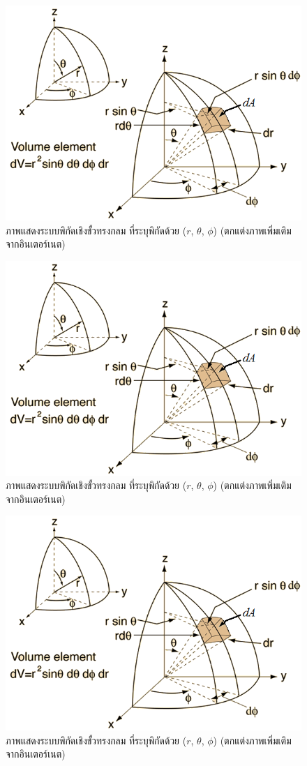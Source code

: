 \begin{figure}[!h]%
\centering
\includegraphics[width=0.75\columnwidth]{sphcoordel.png}
\caption{ภาพแสดงระบบพิกัดเชิงขั้วทรงกลม ที่ระบุพิกัดด้วย ($r$, $\theta$, $\phi$) (ตกแต่งภาพเพิ่มเติมจากอินเตอร์เนต)}
\label{fig7}
\end{figure}

\begin{figure}[!h]%
\centering
\includegraphics[width=0.75\columnwidth]{sphcoordel.png}
\caption{ภาพแสดงระบบพิกัดเชิงขั้วทรงกลม ที่ระบุพิกัดด้วย ($r$, $\theta$, $\phi$) (ตกแต่งภาพเพิ่มเติมจากอินเตอร์เนต)}
\label{fig7}
\end{figure}

\begin{figure}[!h]%
\centering
\includegraphics[width=0.75\columnwidth]{sphcoordel.png}
\caption{ภาพแสดงระบบพิกัดเชิงขั้วทรงกลม ที่ระบุพิกัดด้วย ($r$, $\theta$, $\phi$) (ตกแต่งภาพเพิ่มเติมจากอินเตอร์เนต)}
\label{fig7}
\end{figure}

